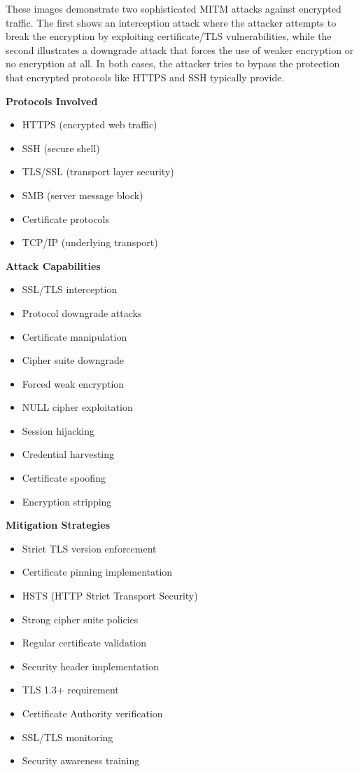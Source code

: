 These images demonstrate two sophisticated MITM attacks against encrypted traffic. The first shows an interception attack where the attacker attempts to break the encryption by exploiting certificate/TLS vulnerabilities, while the second illustrates a downgrade attack that forces the use of weaker encryption or no encryption at all. In both cases, the attacker tries to bypass the protection that encrypted protocols like HTTPS and SSH typically provide.

\textbf{Protocols Involved}
\begin{itemize}
    \item HTTPS (encrypted web traffic)
    \item SSH (secure shell)
    \item TLS/SSL (transport layer security)
    \item SMB (server message block)
    \item Certificate protocols
    \item TCP/IP (underlying transport)
\end{itemize}

\textbf{Attack Capabilities}
\begin{itemize}
    \item SSL/TLS interception
    \item Protocol downgrade attacks
    \item Certificate manipulation
    \item Cipher suite downgrade
    \item Forced weak encryption
    \item NULL cipher exploitation
    \item Session hijacking
    \item Credential harvesting
    \item Certificate spoofing
    \item Encryption stripping
\end{itemize}

\textbf{Mitigation Strategies}
\begin{itemize}
    \item Strict TLS version enforcement
    \item Certificate pinning implementation
    \item HSTS (HTTP Strict Transport Security)
    \item Strong cipher suite policies
    \item Regular certificate validation
    \item Security header implementation
    \item TLS 1.3+ requirement
    \item Certificate Authority verification
    \item SSL/TLS monitoring
    \item Security awareness training
\end{itemize}


